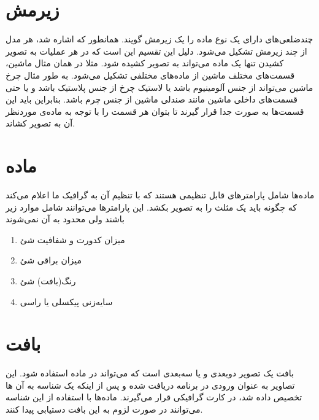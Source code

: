 \section{زیرمش
\protect{}
}
چندضلعی‌های دارای یک نوع ماده
را یک زیرمش گویند.
همانطور که اشاره شد، هر مدل از چند زیرمش تشکیل می‌شود. دلیل این تقسیم این است که در هر عملیات به تصویر کشیدن
تنها یک ماده می‌تواند به تصویر کشیده شود. مثلا در همان مثال ماشین، قسمت‌های مختلف ماشین از ماده‌های مختلفی تشکیل می‌شود. به طور مثال چرخ ماشین می‌تواند از جنس آلومینیوم باشد یا لاستیک چرخ از جنس پلاستیک باشد و یا حتی قسمت‌های داخلی ماشین مانند صندلی ماشین از جنس چرم باشد.
بنابراین باید این قسمت‌ها به صورت جدا قرار گیرند تا بتوان هر قسمت را با توجه به ماده‌ی موردنظر آن به تصویر کشاند.

\section{ماده 
\protect{}
}
ماده‌ها شامل پارامتر‌های قابل تنظیمی هستند که با تنظیم آن به گرافیک ما اعلام می‌کند که چگونه باید یک مثلث را به تصویر بکشد.
این پارامترها می‌توانند شامل موارد زیر باشند ولی محدود به آن نمی‌شوند

\begin{enumerate}
	\item میزان کدورت و شفافیت شئ
 	\item میزان براقی شئ
 	\item رنگ(بافت) شئ
 	\item سایه‌زنی پیکسلی یا راسی \protect{}
\end{enumerate}


\section{بافت
\protect{}
}
بافت یک تصویر دوبعدی و یا سه‌بعدی است که می‌تواند در ماده استفاده شود.
این تصاویر به عنوان ورودی در برنامه دریافت شده و پس از اینکه یک شناسه به آن ها تخصیص داده شد، در کارت گرافیکی قرار می‌گیرند. ماده‌ها با استفاده از این شناسه می‌توانند در صورت لزوم به این بافت دستیابی پیدا کنند.

